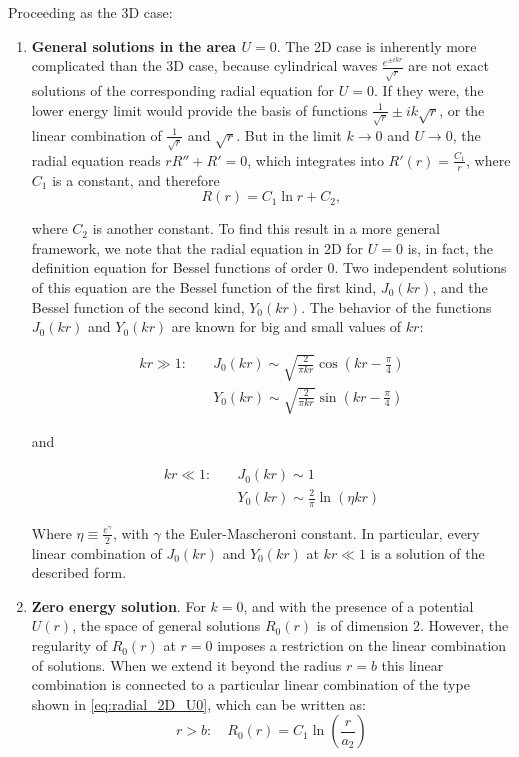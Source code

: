 Proceeding as the 3D case:

\begin{enumerate}
    \item \textbf{General solutions in the area $U=0$}. The 2D case is inherently more complicated than the 3D case, because cylindrical waves $\frac{e^{\pm ikr}}{\sqrt{r}}$ are not exact solutions of the corresponding radial equation for $U=0$. If they were, the lower energy limit would provide the basis of functions $\frac{1}{\sqrt{r}}\pm ik \sqrt{r}$, or the linear combination of $\frac{1}{\sqrt{r}}$ and $\sqrt{r}$. But in the limit $k\to 0$ and $U\to 0$, the radial equation reads $rR''+R'=0$, which integrates into $R'(r)=\frac{C_1}{r}$, where $C_1$ is a constant, and therefore 
    \begin{equation}\label{eq:radial_2D_U0}
    R(r)=C_1\ln r+C_2,
    \end{equation} 
    
    where $C_2$ is another constant. To find this result in a more general framework, we note that the radial equation in 2D for $U=0$ is, in fact, the definition equation for Bessel functions of order 0. Two independent solutions of this equation are the Bessel function of the first kind, $J_0(kr)$, and the Bessel function of the second kind, $Y_0(kr)$. The behavior of the functions $J_0(kr)$ and $Y_0(kr)$ are known for big and small values of $kr$:

    \begin{align*}
        kr\gg 1: & \quad J_0(kr)\sim \sqrt{\frac{2}{\pi kr}}\cos(kr-\frac{\pi}{4}) \\
        & \quad Y_0(kr)\sim \sqrt{\frac{2}{\pi kr}}\sin(kr-\frac{\pi}{4})
    \end{align*}

    and

    \begin{align*}
        kr\ll 1: & \quad J_0(kr)\sim 1 \\
        & \quad Y_0(kr)\sim \frac{2}{\pi} \ln(\eta kr)
    \end{align*}

    Where $\eta\equiv \frac{e^\gamma}{2}$, with $\gamma$ the Euler-Mascheroni constant. In particular, every linear combination of $J_0(kr)$ and $Y_0(kr)$ at $kr\ll 1$ is a solution of the described form.

    \item \textbf{Zero energy solution}. For $k=0$, and with the presence of a potential $U(r)$, the space of general solutions $R_0(r)$ is of dimension 2. However, the regularity of $R_0(r)$ at $r=0$ imposes a restriction on the linear combination of solutions. When we extend it beyond the radius $r=b$ this linear combination is connected to a particular linear combination of the type shown in \cref{eq:radial_2D_U0}, which can be written as:
    \begin{equation}
        r>b:\quad R_0(r)=C_1\ln(\frac{r}{a_2})
    \end{equation}


\end{enumerate}
